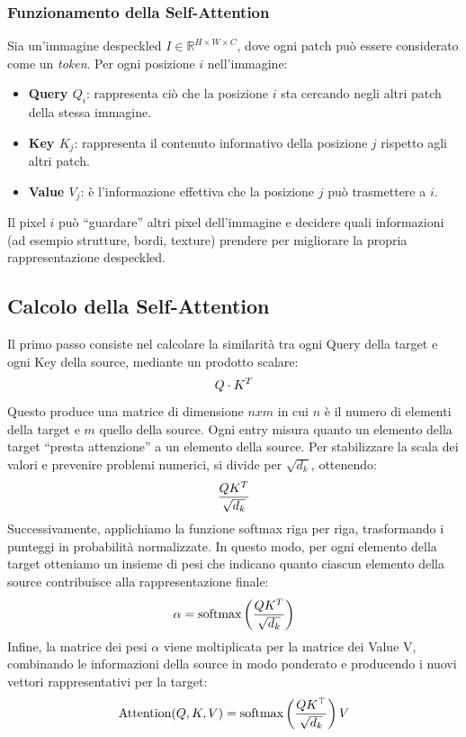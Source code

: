 \subsubsection{Funzionamento della Self-Attention}
Sia un'immagine despeckled \(I \in \mathbb{R}^{H \times W \times C}\), dove ogni patch può essere considerato come un \emph{token}.  
Per ogni posizione \(i\) nell'immagine:

\begin{itemize}
    \item \textbf{Query \(Q_i\)}: rappresenta ciò che la posizione \(i\) sta cercando negli altri patch della stessa immagine.
    \item \textbf{Key \(K_j\)}: rappresenta il contenuto informativo della posizione \(j\) rispetto agli altri patch.
    \item \textbf{Value \(V_j\)}: è l'informazione effettiva che la posizione \(j\) può trasmettere a \(i\).
\end{itemize}
Il pixel \(i\) può ``guardare'' altri pixel dell'immagine e decidere quali informazioni (ad esempio strutture, bordi, texture) prendere per migliorare la propria rappresentazione despeckled.

\subsection{Calcolo della Self-Attention}
Il primo passo consiste \cite{vaswani2023attentionneed} nel calcolare la similarità tra ogni Query della target e ogni Key della source, mediante un prodotto scalare:
\[
    \makebox[\textwidth][c]{%
      $\displaystyle
        Q \cdot K^T
      $%
    }
\]
Questo produce una matrice di dimensione $nxm$ in cui $n$ è il numero di elementi della target e $m$ 
quello della source. Ogni entry misura quanto un elemento della target “presta attenzione” a un elemento 
della source. Per stabilizzare la scala dei valori e prevenire problemi numerici, si divide per $\sqrt{d_k}$, ottenendo:
\[
    \makebox[\textwidth][c]{%
      $\displaystyle
        \frac{QK^T}{\sqrt{d_k}}
      $%
    }
\]
Successivamente, applichiamo la funzione softmax riga per riga, trasformando i punteggi in probabilità normalizzate. 
In questo modo, per ogni elemento della target otteniamo un insieme di pesi che indicano quanto ciascun elemento della source contribuisce alla rappresentazione finale:
\[
    \makebox[\textwidth][c]{%
      $\displaystyle
        \alpha = \text{softmax}\left(\frac{QK^T}{\sqrt{d_k}}\right)
      $%
    }
\]
Infine, la matrice dei pesi $\alpha$ viene moltiplicata per la matrice dei Value 
V, combinando le informazioni della source in modo ponderato e producendo i nuovi vettori rappresentativi per la target:
\begin{equation}
    \makebox[\textwidth][c]{%
      $\displaystyle
        \text{Attention}(Q, K, V) = \text{softmax}\left(\frac{Q K^\top}{\sqrt{d_k}}\right)V
      $%
    }
    \label{eq:attention}
    \end{equation}
    

